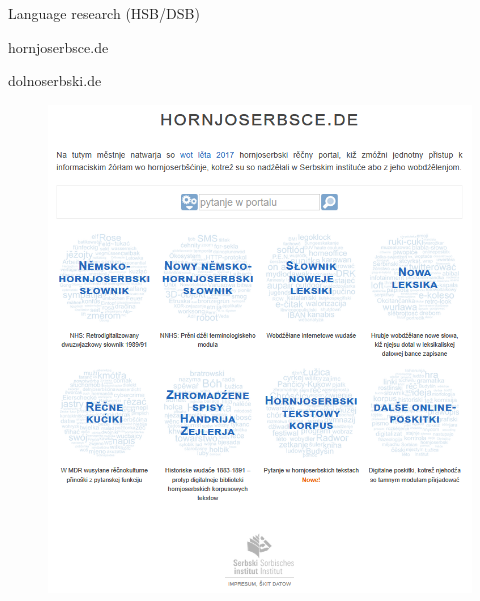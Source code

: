   \begin{block}{Language research (HSB/DSB)}  
  

    hornjoserbsce.de

    dolnoserbski.de

    \begin{figure}
        \centering
        \includegraphics[width=0.7\colwidth]{hornjoserbsce_gross.png}
        \label{fig:hornjoserbsce}
    \end{figure}

  \end{block}
